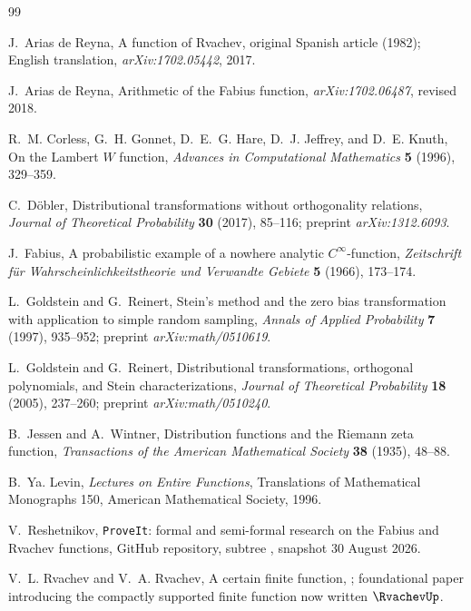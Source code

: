 \documentclass[11pt,oneside]{article}
\theoremstyle{definition}
\theoremstyle{remark}
\newcommand{\repo}{\texttt{ProveIt}}
\begin{document}
\begin{thebibliography}{99}

J.~Arias de Reyna,
\newblock A function of Rvachev,
\newblock original Spanish article (1982); English translation,
\emph{arXiv:1702.05442}, 2017.

J.~Arias de Reyna,
\newblock Arithmetic of the Fabius function,
\newblock \emph{arXiv:1702.06487}, revised 2018.

R.~M. Corless, G.~H. Gonnet, D.~E.~G. Hare, D.~J. Jeffrey, and D.~E. Knuth,
\newblock On the Lambert $W$ function,
\newblock \emph{Advances in Computational Mathematics} \textbf{5} (1996),
329--359.

C.~D\"obler,
\newblock Distributional transformations without orthogonality relations,
\newblock \emph{Journal of Theoretical Probability} \textbf{30} (2017),
85--116; preprint \emph{arXiv:1312.6093}.

J.~Fabius,
\newblock A probabilistic example of a nowhere analytic $C^\infty$-function,
\newblock \emph{Zeitschrift f\"ur Wahrscheinlichkeitstheorie und Verwandte
Gebiete} \textbf{5} (1966), 173--174.

L.~Goldstein and G.~Reinert,
\newblock Stein's method and the zero bias transformation with application to
simple random sampling,
\newblock \emph{Annals of Applied Probability} \textbf{7} (1997), 935--952;
preprint \emph{arXiv:math/0510619}.

L.~Goldstein and G.~Reinert,
\newblock Distributional transformations, orthogonal polynomials, and Stein
characterizations,
\newblock \emph{Journal of Theoretical Probability} \textbf{18} (2005),
237--260; preprint \emph{arXiv:math/0510240}.

B.~Jessen and A.~Wintner,
\newblock Distribution functions and the Riemann zeta function,
\newblock \emph{Transactions of the American Mathematical Society}
\textbf{38} (1935), 48--88.

B.~Ya. Levin,
\newblock \emph{Lectures on Entire Functions},
\newblock Translations of Mathematical Monographs 150, American Mathematical
Society, 1996.

V.~Reshetnikov,
\newblock \repo: formal and semi-formal research on the Fabius and Rvachev
functions,
\newblock GitHub repository, subtree , snapshot
30 August 2026.

V.~L. Rvachev and V.~A. Rvachev,
\newblock A certain finite function,
; foundational paper introducing the compactly supported finite
function now written $\RvachevUp$.

\end{thebibliography}
\end{document}
